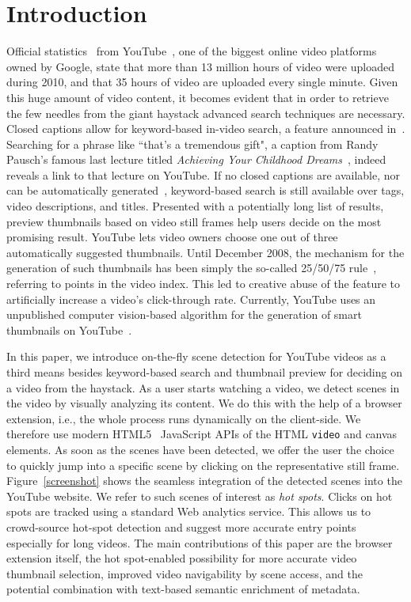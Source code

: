 \documentclass[10pt,twocolumn,letterpaper]{article}
\begin{document}
\section{Introduction}
Official statistics~\cite{youtube:stats} from YouTube~\cite{youtube}, one of the biggest online video platforms owned by Google, state that more than 13 million hours of video were uploaded during 2010, and that 35 hours of video are uploaded every single minute. Given this huge amount of video content, it becomes evident that in order to retrieve the few needles from the giant haystack advanced search techniques are necessary. Closed captions allow for keyword-based in-video search, a feature announced in~\cite{googlevideo}. Searching for a phrase like ``that's a tremendous gift", a caption from Randy Pausch's famous last lecture titled \emph{Achieving Your Childhood Dreams}~\cite{pausch}, indeed reveals a link to that lecture on YouTube. If no closed captions are available, nor can be automatically generated~\cite{youtubecaptions}, keyword-based search is still available over tags, video descriptions, and titles. Presented with a potentially long list of results, preview thumbnails based on video still frames help users decide on the most promising result. YouTube lets video owners choose one out of three automatically suggested thumbnails. Until December 2008, the mechanism for the generation of such thumbnails has been simply the so-called 25/50/75 rule~\cite{youtuberule}, referring to points in the video index. This led to creative abuse of the feature to artificially increase a video's click-through rate. Currently, YouTube uses an unpublished computer vision-based algorithm for the generation of smart thumbnails on YouTube~\cite{googleresearch}.

In this paper, we introduce on-the-fly scene detection for YouTube videos as a third means besides keyword-based search and thumbnail preview for deciding on a video from the haystack. As a user starts watching a video, we detect scenes in the video by visually analyzing its content. We do this with the help of a browser extension, i.e., the whole process runs dynamically on the client-side. We therefore use modern HTML5~\cite{w3c_html5} JavaScript APIs of the HTML \texttt{video} and {canvas} elements. As soon as the scenes have been detected, we offer the user the choice to quickly jump into a specific scene by clicking on the representative still frame. Figure~\ref{screenshot} shows the seamless integration of the detected scenes into the YouTube website. We refer to such scenes of interest as \emph{hot spots}. Clicks on hot spots are tracked using a standard Web analytics service. This allows us to crowd-source hot-spot detection and suggest more accurate entry points especially for long videos. The main contributions of this paper are the browser extension itself, the hot spot-enabled possibility for more accurate video thumbnail selection, improved video navigability by scene access, and the potential combination with text-based semantic enrichment of metadata.
\end{document}
